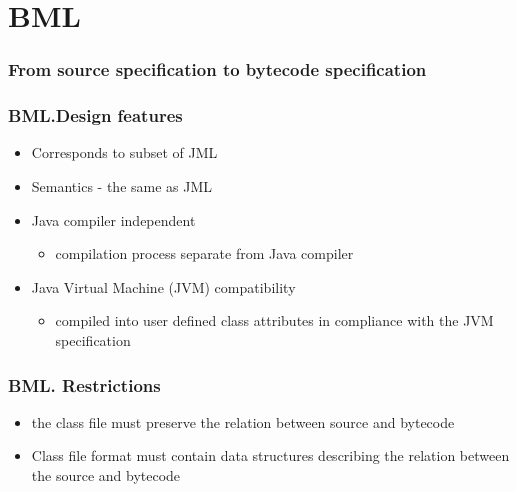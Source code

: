 \documentclass{beamer}
\begin{document}

\section{BML}
\begin{frame}
\frametitle{From source specification to bytecode specification}
\begin{figure}[hc]
\begin{center}
\end{center}
\end{figure}
\end{frame}

  \begin{frame}[shrink]\frametitle{BML.Design features}
   \begin{itemize}
      \item Corresponds to subset of JML
       \item Semantics - the same  as JML
     \item Java compiler independent
        \begin{itemize}
	    \item compilation process separate from Java compiler
	      
	  \end{itemize}
     \item Java Virtual Machine (JVM) compatibility 
       \begin{itemize}
	      \item compiled into user defined class attributes 
		 in compliance with the JVM specification
	  \end{itemize}     
   \end{itemize} 
\end{frame}



  \begin{frame}[shrink]\frametitle{BML. Restrictions}
   \begin{itemize} 
       \item the class file must preserve the relation between source and bytecode 
	 
	  
       \item Class file format must contain data structures describing the relation between 
	    the source and bytecode      
   \end{itemize}
 \end{frame}
\end{document}
